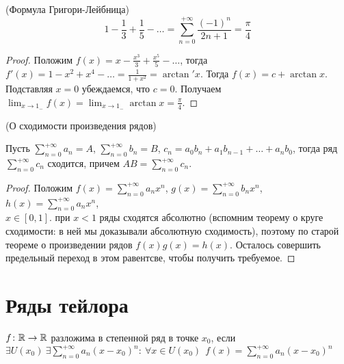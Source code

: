 \begin{theorem}(Формула Григори-Лейбница)
\[
    1 - \frac{1}{3} + \frac{1}{5} - \ldots
    = \sum_{n = 0}^{+\infty}{\frac{(-1)^n}{2n + 1}}
    = \frac{\pi}{4}
\]
\end{theorem}
\begin{proof}
    Положим $\displaystyle f(x) = x - \frac{x^3}{3} + \frac{x^5}{5} - \ldots$,
    тогда $\displaystyle f'(x) = 1 - x^2 + x^4 - \ldots = \frac{1}{1 + x^2} =
    \arctan'{x}$. Тогда $f(x) = c + \arctan{x}$. Подставляя $x = 0$ убеждаемся,
    что $c = 0$. Получаем $\displaystyle \lim_{x \to 1_{-}}{f(x)}
    = \lim_{x \to 1_{-}}{\arctan{x}} = \frac{\pi}{4}$.
\end{proof}

\begin{corollary}(О сходимости произведения рядов)

    Пусть $\displaystyle \sum_{n = 0}^{+\infty}{a_n} = A$, $\displaystyle
    \sum_{n = 0}^{+\infty}{b_n} = B$, $c_n = a_0 b_n + a_1 b_{n - 1} + \ldots
    + a_n b_0$, тогда ряд $\displaystyle \sum_{n = 0}^{+\infty}{c_n}$ сходится,
    причем $\displaystyle AB = \sum_{n = 0}^{+\infty}{c_n}$.
\end{corollary}
\begin{proof}

    Положим $\displaystyle f(x) = \sum_{n = 0}^{+\infty}{a_n x^n}$,
    $\displaystyle g(x) = \sum_{n = 0}^{+\infty}{b_n x^n}$, $\displaystyle h(x)
    = \sum_{n = 0}^{+\infty}{a_n x^n}$, \\ $x \in [0, 1]$. при $x < 1$ ряды
    сходятся абсолютно (вспомним теорему о круге сходимости: в ней мы доказывали
    абсолютную сходимость), поэтому по старой теореме о произведении рядов $f(x)
    g(x) = h(x)$. Осталось совершить предельный переход в этом равентсве, чтобы
    получить требуемое.
\end{proof}

\newpage
\section{Ряды тейлора}

\begin{definition}
    $f \colon \mathbb{R} \to \mathbb{R}$ разложима в степенной ряд в точке $x_0$, если \\
    $\displaystyle \exists U(x_0)~ \exists \sum_{n = 0}^{+\infty}{a_n (x -
    x_0)^n} \colon~ \forall x \in U(x_0)~~ f(x) = \sum_{n = 0}^{+\infty}{a_n
    (x - x_0)^n}$
\end{definition}

